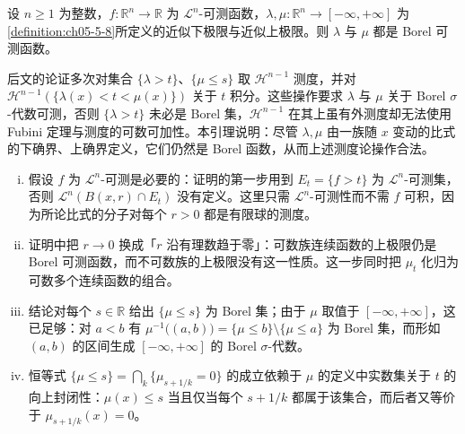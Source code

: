 \documentclass[../../main.tex]{subfiles}%
\begin{document}
\begin{lemma}\label{lemma:ch05-5-6}
设 $n\geqslant1$ 为整数，$f:\mathbb{R}^n\to\mathbb{R}$ 为 $\mathcal{L}^n$-可测函数，$\lambda,\mu:\mathbb{R}^n\to[-\infty,+\infty]$ 为\cref{definition:ch05-5-8}所定义的近似下极限与近似上极限。则 $\lambda$ 与 $\mu$ 都是 Borel 可测函数。 %
\end{lemma}

\begin{remark}\label{remark:ch05-lem-5-6-动机}
后文的论证多次对集合 $\{\lambda>t\}$、$\{\mu\leqslant s\}$ 取 $\mathcal{H}^{n-1}$ 测度，并对 $\mathcal{H}^{n-1}(\{\lambda(x)<t<\mu(x)\})$ 关于 $t$ 积分。这些操作要求 $\lambda$ 与 $\mu$ 关于 Borel $\sigma$-代数可测，否则 $\{\lambda>t\}$ 未必是 Borel 集，$\mathcal{H}^{n-1}$ 在其上虽有外测度却无法使用 Fubini 定理与测度的可数可加性。本引理说明：尽管 $\lambda,\mu$ 由一族随 $x$ 变动的比式的下确界、上确界定义，它们仍然是 Borel 函数，从而上述测度论操作合法。
\end{remark}

\begin{remark}\label{remark:ch05-lem-5-6-条件}
\begin{enumerate}[(i)]
\item 假设 $f$ 为 $\mathcal{L}^n$-可测是必要的：证明的第一步用到 $E_t=\{f>t\}$ 为 $\mathcal{L}^n$-可测集，否则 $\mathcal{L}^n(B(x,r)\cap E_t)$ 没有定义。这里只需 $\mathcal{L}^n$-可测性而不需 $f$ 可积，因为所论比式的分子对每个 $r>0$ 都是有限球的测度。
\item 证明中把 $r\to0$ 换成「$r$ 沿有理数趋于零」：可数族连续函数的上极限仍是 Borel 可测函数，而不可数族的上极限没有这一性质。这一步同时把 $\mu_t$ 化归为可数多个连续函数的组合。
\item 结论对每个 $s\in\mathbb{R}$ 给出 $\{\mu\leqslant s\}$ 为 Borel 集；由于 $\mu$ 取值于 $[-\infty,+\infty]$，这已足够：对 $a<b$ 有 $\mu^{-1}\bigl((a,b)\bigr)=\{\mu\leqslant b\}\setminus\{\mu\leqslant a\}$ 为 Borel 集，而形如 $(a,b)$ 的区间生成 $[-\infty,+\infty]$ 的 Borel $\sigma$-代数。
\item 恒等式 $\{\mu\leqslant s\}=\bigcap_{k}\{\mu_{s+1/k}=0\}$ 的成立依赖于 $\mu$ 的定义中实数集关于 $t$ 的向上封闭性：$\mu(x)\leqslant s$ 当且仅当每个 $s+1/k$ 都属于该集合，而后者又等价于 $\mu_{s+1/k}(x)=0$。
\end{enumerate}
\end{remark}
\end{document}
